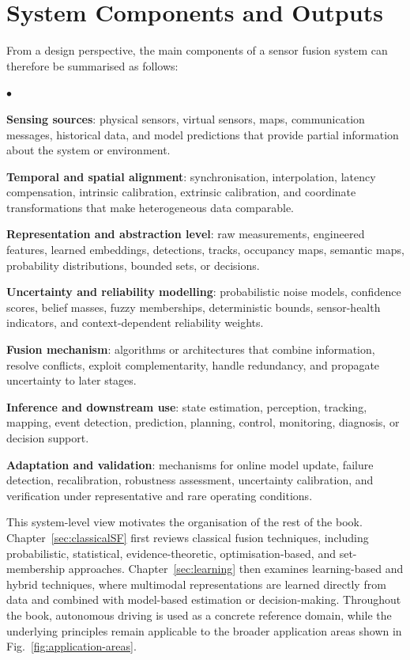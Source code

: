\documentclass[graybox,envcountchap]{style/SNmono}
\newenvironment{list4a}{
  \begin{list}{$\bullet$}{
      \setlength{\itemsep}{0.05cm}
      \setlength{\labelsep}{0.2cm}
      \setlength{\labelwidth}{0.3cm}
      \setlength{\parsep}{0in}
      \setlength{\parskip}{0in}
      \setlength{\topsep}{0in}
      \setlength{\partopsep}{0in}
      \setlength{\leftmargin}{0.16in}}}
      {\end{list}}
\providecommand{\DIFadd}[1]{{\protect\color{blue} #1}} %
\providecommand{\DIFaddbegin}{} %
\providecommand{\DIFaddend}{} %
\begin{document}
\DIFaddbegin \section{\DIFadd{System Components and Outputs}}
\DIFaddend From a design perspective, the main components of a sensor fusion system can therefore be summarised as follows:
\begin{list4a}
    \item \textbf{Sensing sources}: physical sensors, virtual sensors, maps, communication messages, historical data, and model predictions that provide partial information about the system or environment.
    \item \textbf{Temporal and spatial alignment}: synchronisation, interpolation, latency compensation, intrinsic calibration, extrinsic calibration, and coordinate transformations that make heterogeneous data comparable.
    \item \textbf{Representation and abstraction level}: raw measurements, engineered features, learned embeddings, detections, tracks, occupancy maps, semantic maps, probability distributions, bounded sets, or decisions.
    \item \textbf{Uncertainty and reliability modelling}: probabilistic noise models, confidence scores, belief masses, fuzzy memberships, deterministic bounds, sensor-health indicators, and context-dependent reliability weights.
    \item \textbf{Fusion mechanism}: algorithms or architectures that combine information, resolve conflicts, exploit complementarity, handle redundancy, and propagate uncertainty to later stages.
    \item \textbf{Inference and downstream use}: state estimation, perception, tracking, mapping, event detection, prediction, planning, control, monitoring, diagnosis, or decision support.
    \item \textbf{Adaptation and validation}: mechanisms for online model update, failure detection, recalibration, robustness assessment, uncertainty calibration, and verification under representative and rare operating conditions.
\end{list4a}

This system-level view motivates the organisation of the rest of the book. Chapter~\ref{sec:classicalSF} first reviews classical fusion techniques, including probabilistic, statistical, evidence-theoretic, optimisation-based, and set-membership approaches. Chapter~\ref{sec:learning} then examines learning-based and hybrid techniques, where multimodal representations are learned directly from data and combined with model-based estimation or decision-making. Throughout the book, autonomous driving is used as a concrete reference domain, while the underlying principles remain applicable to the broader application areas shown in Fig.~\ref{fig:application-areas}.
\end{document}
